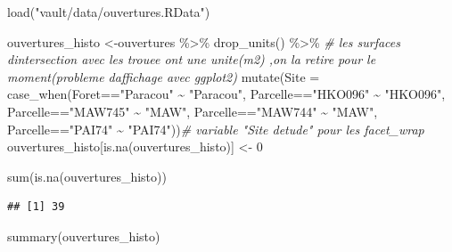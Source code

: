 \documentclass[
  12pt,
  american,
  a4paper,
  extrafontsizes,onecolumn,openright
  ]{memoir}
\newenvironment{Shaded}{\begin{snugshade}}{\end{snugshade}}
\newcommand{\AttributeTok}[1]{\textcolor[rgb]{0.77,0.63,0.00}{#1}}
\newcommand{\CommentTok}[1]{\textcolor[rgb]{0.56,0.35,0.01}{\textit{#1}}}
\newcommand{\DecValTok}[1]{\textcolor[rgb]{0.00,0.00,0.81}{#1}}
\newcommand{\FunctionTok}[1]{\textcolor[rgb]{0.00,0.00,0.00}{#1}}
\newcommand{\NormalTok}[1]{#1}
\newcommand{\OtherTok}[1]{\textcolor[rgb]{0.56,0.35,0.01}{#1}}
\newcommand{\SpecialCharTok}[1]{\textcolor[rgb]{0.00,0.00,0.00}{#1}}
\newcommand{\StringTok}[1]{\textcolor[rgb]{0.31,0.60,0.02}{#1}}
\newlength{\rf}
\begin{document}
\begin{Shaded}
\begin{Highlighting}[]
\FunctionTok{load}\NormalTok{(}\StringTok{"vault/data/ouvertures.RData"}\NormalTok{)}

\NormalTok{ouvertures\_histo }\OtherTok{\textless{}{-}}\NormalTok{ouvertures }\SpecialCharTok{\%\textgreater{}\%} 
  \FunctionTok{drop\_units}\NormalTok{() }\SpecialCharTok{\%\textgreater{}\%} \CommentTok{\# les surfaces d\textquotesingle{}intersection avec les trouee ont une unite(m2) ,on la retire pour le moment(probleme d\textquotesingle{}affichage avec ggplot2)}
  \FunctionTok{mutate}\NormalTok{(}\AttributeTok{Site =} \FunctionTok{case\_when}\NormalTok{(Foret}\SpecialCharTok{==}\StringTok{"Paracou"} \SpecialCharTok{\textasciitilde{}} \StringTok{"Paracou"}\NormalTok{,}
\NormalTok{                           Parcelle}\SpecialCharTok{==}\StringTok{"HKO096"} \SpecialCharTok{\textasciitilde{}} \StringTok{"HKO096"}\NormalTok{,}
\NormalTok{                           Parcelle}\SpecialCharTok{==}\StringTok{"MAW745"} \SpecialCharTok{\textasciitilde{}} \StringTok{"MAW"}\NormalTok{,}
\NormalTok{                           Parcelle}\SpecialCharTok{==}\StringTok{"MAW744"} \SpecialCharTok{\textasciitilde{}} \StringTok{"MAW"}\NormalTok{,}
\NormalTok{                           Parcelle}\SpecialCharTok{==}\StringTok{"PAI74"} \SpecialCharTok{\textasciitilde{}} \StringTok{"PAI74"}\NormalTok{))}\CommentTok{\# variable "Site d\textquotesingle{}etude" pour les facet\_wrap}
\NormalTok{ouvertures\_histo[}\FunctionTok{is.na}\NormalTok{(ouvertures\_histo)] }\OtherTok{\textless{}{-}} \DecValTok{0}

\FunctionTok{sum}\NormalTok{(}\FunctionTok{is.na}\NormalTok{(ouvertures\_histo))}
\end{Highlighting}
\end{Shaded}

\begin{verbatim}
## [1] 39
\end{verbatim}

\begin{Shaded}
\begin{Highlighting}[]
\FunctionTok{summary}\NormalTok{(ouvertures\_histo)}
\end{Highlighting}
\end{Shaded}
\end{document}
